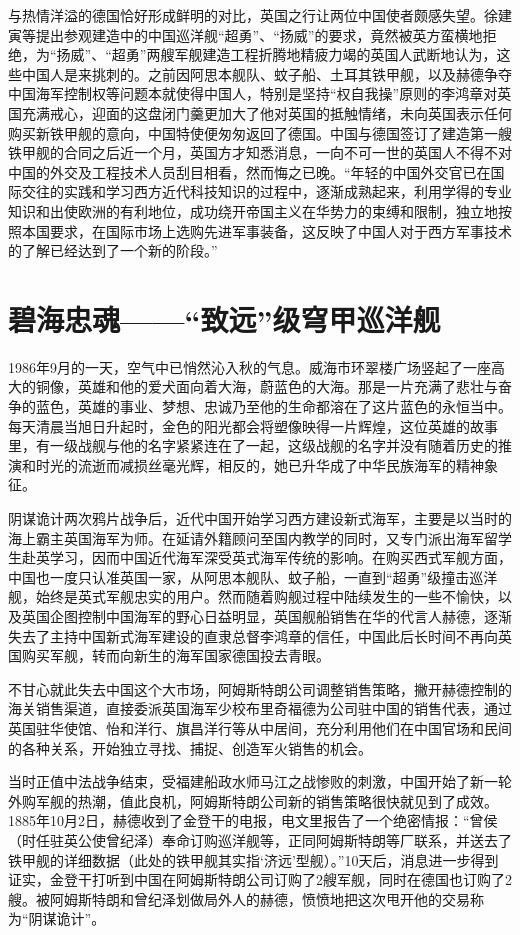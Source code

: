 \documentclass[12pt,UTF8]{ctexbook}
\begin{document}
与热情洋溢的德国恰好形成鲜明的对比，英国之行让两位中国使者颇感失望。徐建寅等提出参观建造中的中国巡洋舰“超勇”、“扬威”的要求，竟然被英方蛮横地拒绝，为“扬威”、“超勇”两艘军舰建造工程折腾地精疲力竭的英国人武断地认为，这些中国人是来挑刺的。之前因阿思本舰队、蚊子船、土耳其铁甲舰，以及赫德争夺中国海军控制权等问题本就使得中国人，特别是坚持“权自我操”原则的李鸿章对英国充满戒心，迎面的这盘闭门羹更加大了他对英国的抵触情绪，未向英国表示任何购买新铁甲舰的意向，中国特使便匆匆返回了德国。中国与德国签订了建造第一艘铁甲舰的合同之后近一个月，英国方才知悉消息，一向不可一世的英国人不得不对中国的外交及工程技术人员刮目相看，然而悔之已晚。“年轻的中国外交官已在国际交往的实践和学习西方近代科技知识的过程中，逐渐成熟起来，利用学得的专业知识和出使欧洲的有利地位，成功绕开帝国主义在华势力的束缚和限制，独立地按照本国要求，在国际市场上选购先进军事装备，这反映了中国人对于西方军事技术的了解已经达到了一个新的阶段。”



\chapter{碧海忠魂——“致远”级穹甲巡洋舰}

1986年9月的一天，空气中已悄然沁入秋的气息。威海市环翠楼广场竖起了一座高大的铜像，英雄和他的爱犬面向着大海，蔚蓝色的大海。那是一片充满了悲壮与奋争的蓝色，英雄的事业、梦想、忠诚乃至他的生命都溶在了这片蓝色的永恒当中。每天清晨当旭日升起时，金色的阳光都会将塑像映得一片辉煌，这位英雄的故事里，有一级战舰与他的名字紧紧连在了一起，这级战舰的名字并没有随着历史的推演和时光的流逝而减损丝毫光辉，相反的，她已升华成了中华民族海军的精神象征。

阴谋诡计两次鸦片战争后，近代中国开始学习西方建设新式海军，主要是以当时的海上霸主英国海军为师。在延请外籍顾问至国内教学的同时，又专门派出海军留学生赴英学习，因而中国近代海军深受英式海军传统的影响。在购买西式军舰方面，中国也一度只认准英国一家，从阿思本舰队、蚊子船，一直到“超勇”级撞击巡洋舰，始终是英式军舰忠实的用户。然而随着购舰过程中陆续发生的一些不愉快，以及英国企图控制中国海军的野心日益明显，英国舰船销售在华的代言人赫德，逐渐失去了主持中国新式海军建设的直隶总督李鸿章的信任，中国此后长时间不再向英国购买军舰，转而向新生的海军国家德国投去青眼。

不甘心就此失去中国这个大市场，阿姆斯特朗公司调整销售策略，撇开赫德控制的海关销售渠道，直接委派英国海军少校布里奇福德为公司驻中国的销售代表，通过英国驻华使馆、怡和洋行、旗昌洋行等从中居间，充分利用他们在中国官场和民间的各种关系，开始独立寻找、捕捉、创造军火销售的机会。

当时正值中法战争结束，受福建船政水师马江之战惨败的刺激，中国开始了新一轮外购军舰的热潮，值此良机，阿姆斯特朗公司新的销售策略很快就见到了成效。1885年10月2日，赫德收到了金登干的电报，电文里报告了一个绝密情报：“曾侯（时任驻英公使曾纪泽）奉命订购巡洋舰等，正同阿姆斯特朗等厂联系，并送去了铁甲舰的详细数据（此处的铁甲舰其实指‘济远’型舰）。”10天后，消息进一步得到证实，金登干打听到中国在阿姆斯特朗公司订购了2艘军舰，同时在德国也订购了2艘。被阿姆斯特朗和曾纪泽划做局外人的赫德，愤愤地把这次甩开他的交易称为“阴谋诡计”。
\end{document}
